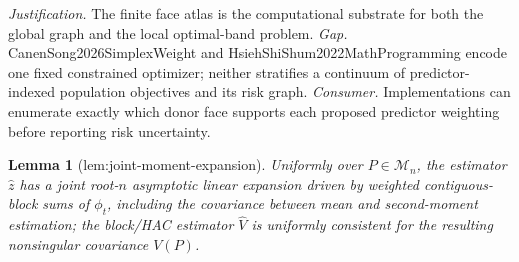 \documentclass{article}
\newtheorem{lemma}{Lemma}
\begin{document}
\par\smallskip\noindent \textit{Justification.} The finite face atlas is the computational substrate for both the global graph and the local optimal-band problem. \textit{Gap.} CanenSong2026SimplexWeight and HsiehShiShum2022MathProgramming encode one fixed constrained optimizer; neither stratifies a continuum of predictor-indexed population objectives and its risk graph. \textit{Consumer.} Implementations can enumerate exactly which donor face supports each proposed predictor weighting before reporting risk uncertainty.

\begin{lemma}[lem:joint-moment-expansion]\label{lem:joint-moment-expansion}
Uniformly over \(P\in\mathcal M_n\), the estimator \(\widehat z\) has a joint root-\(n\) asymptotic linear expansion driven by weighted contiguous-block sums of \(\phi_t\), including the covariance between mean and second-moment estimation; the block/HAC estimator \(\widehat V\) is uniformly consistent for the resulting nonsingular covariance \(V(P)\).
\end{lemma}
\end{document}
